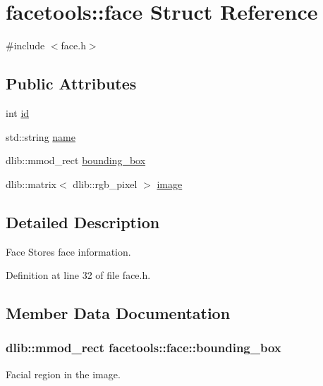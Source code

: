 \hypertarget{structfacetools_1_1face}{}\section{facetools\+:\+:face Struct Reference}
\label{structfacetools_1_1face}


{\ttfamily \#include $<$face.\+h$>$}

\subsection*{Public Attributes}
\begin{DoxyCompactItemize}
\item 
int \hyperlink{structfacetools_1_1face_a43e0fae69b073d4f18fbdd480ac33294}{id}
\item 
std\+::string \hyperlink{structfacetools_1_1face_a8e54b836e74d323043b30c459be1607c}{name}
\item 
dlib\+::mmod\+\_\+rect \hyperlink{structfacetools_1_1face_a39cf2b5537baebae6408e54384fc4d81}{bounding\+\_\+box}
\item 
dlib\+::matrix$<$ dlib\+::rgb\+\_\+pixel $>$ \hyperlink{structfacetools_1_1face_a4ea442a55dae5f2866c2955c138becae}{image}
\end{DoxyCompactItemize}


\subsection{Detailed Description}
Face Stores face information. 

Definition at line 32 of file face.\+h.



\subsection{Member Data Documentation}
\subsubsection[{\texorpdfstring{bounding\+\_\+box}{bounding_box}}]{\setlength{\rightskip}{0pt plus 5cm}dlib\+::mmod\+\_\+rect facetools\+::face\+::bounding\+\_\+box}\hypertarget{structfacetools_1_1face_a39cf2b5537baebae6408e54384fc4d81}{}\label{structfacetools_1_1face_a39cf2b5537baebae6408e54384fc4d81}
Facial region in the image. 

